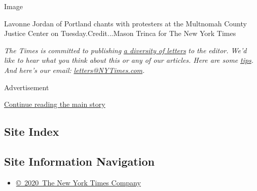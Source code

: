 Image

Lavonne Jordan of Portland chants with protesters at the Multnomah
County Justice Center on Tuesday.Credit...Mason Trinca for The New York
Times

\emph{The Times is committed to publishing}
\href{https://www.nytimes3xbfgragh.onion/2019/01/31/opinion/letters/letters-to-editor-new-york-times-women.html}{\emph{a
diversity of letters}} \emph{to the editor. We'd like to hear what you
think about this or any of our articles. Here are some}
\href{https://help.nytimes3xbfgragh.onion/hc/en-us/articles/115014925288-How-to-submit-a-letter-to-the-editor}{\emph{tips}}\emph{.
And here's our email:}
\href{mailto:letters@NYTimes.com}{\emph{letters@NYTimes.com}}\emph{.}

Advertisement

\protect\hyperlink{after-bottom}{Continue reading the main story}

\hypertarget{site-index}{%
\subsection{Site Index}\label{site-index}}

\hypertarget{site-information-navigation}{%
\subsection{Site Information
Navigation}\label{site-information-navigation}}

\begin{itemize}
\tightlist
\item
  \href{https://help.nytimes3xbfgragh.onion/hc/en-us/articles/115014792127-Copyright-notice}{©~2020~The
  New York Times Company}
\end{itemize}

